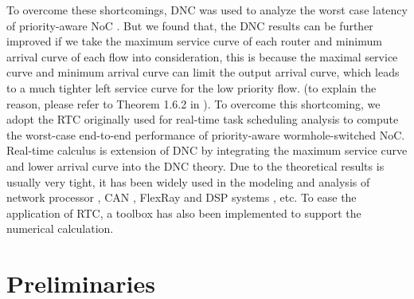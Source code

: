 \documentclass[10pt,journal]{IEEEtran}
\begin{document}
To overcome these shortcomings, DNC was used to analyze the worst case latency of priority-aware NoC \cite{Qian489900}. But we found that, the DNC results can be further improved if we take the maximum service curve of each router and minimum arrival curve of each flow into consideration, this is because the maximal service curve and minimum arrival curve can limit the output arrival curve, which leads to a much tighter left service curve for the low priority flow. (to explain the reason, please refer to Theorem 1.6.2 in \cite{Boudec2001Network}). To overcome this shortcoming, we adopt the RTC \cite{ThCN00}\cite{1253607} originally used for real-time task scheduling analysis to compute the worst-case end-to-end performance of priority-aware wormhole-switched NoC. Real-time calculus is extension of DNC by integrating the maximum service curve and lower arrival curve into the DNC theory. Due to the theoretical results is usually very tight, it has been widely used in the modeling and analysis of network processor \cite{1253838}, CAN \cite{4617308}, FlexRay \cite{Chokshi:2010:PAF:1774088.1774162}\cite{Hagiescu:2007:PAF:1278480.1278554} and DSP systems \cite{thiele2005performance}, etc. To ease the application of RTC, a toolbox \cite{rtc} has also been implemented to support the numerical calculation.

\section{Preliminaries}\label{model}
\end{document}
